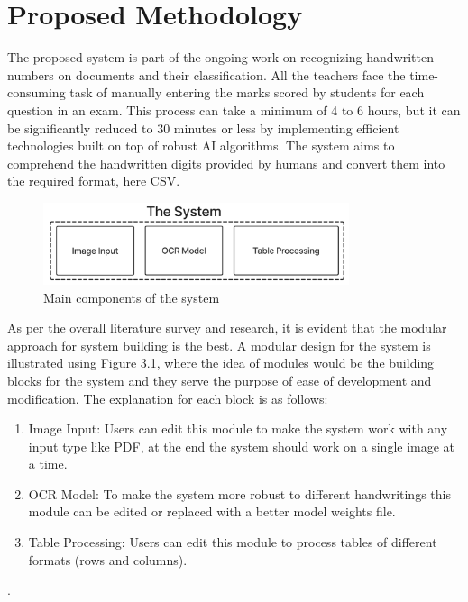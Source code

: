 \chapter{Proposed Methodology}

The proposed system is part of the ongoing work on recognizing handwritten numbers on documents and their classification. All the teachers face the time-consuming task of manually entering the marks scored by students for each question in an exam. This process can take a minimum of 4 to 6 hours, but it can be significantly reduced to 30 minutes or less by implementing efficient technologies built on top of robust AI algorithms. The system aims to comprehend the handwritten digits provided by humans and convert them into the required format, here CSV.

\vspace{1.5mm}

\begin{figure}[h!]
    \centering
    \includegraphics[width=0.8\textwidth]{Images/lit_review/main_components_of_MP.jpg}
    \caption{Main components of the system}
\end{figure}

\noindent
As per the overall literature survey and research, it is evident that the modular approach for system building is the best. A modular design for the system is illustrated using Figure 3.1, where the idea of modules would be the building blocks for the system and they serve the purpose of ease of development and modification. The explanation for each block is as follows: 

\clearpage

\begin{enumerate}
    \item Image Input: Users can edit this module to make the system work with any input type like PDF, at the end the system should work on a single image at a time.
    \item OCR Model: To make the system more robust to different handwritings this module can be edited or replaced with a better model weights file. 
    \item Table Processing: Users can edit this module to process tables of different formats (rows and columns).
\end{enumerate}.


